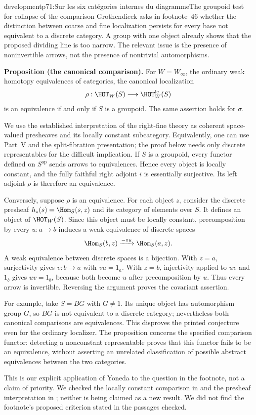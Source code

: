 \begin{dcomment}{development}{p71:Sur les six catégories internes du diagramme}{The groupoid test for collapse of the comparison}
Grothendieck asks in footnote~46 whether the distinction between coarse and fine localization persists for every base not equivalent to a discrete category. A group with one object already shows that the proposed dividing line is too narrow. The relevant issue is the presence of noninvertible arrows, not the presence of nontrivial automorphisms.

\textbf{Proposition (the canonical comparison).}\ours
For $W=W_\infty$, the ordinary weak homotopy equivalences of categories, the canonical localization
\[
 \rho:\HOT_W(S)\longrightarrow\HOT_W^{\mathrm{lc}}(S)
\]
is an equivalence if and only if $S$ is a groupoid. The same assertion holds for $\sigma$.

We use the established interpretation of the right-fine theory as coherent space-valued presheaves and its locally constant subcategory. Equivalently, one can use Part~V and the split-fibration presentation; the proof below needs only discrete representables for the difficult implication. If $S$ is a groupoid, every functor defined on $S^{\mathrm{op}}$ sends arrows to equivalences. Hence every object is locally constant, and the fully faithful right adjoint $i$ is essentially surjective. Its left adjoint $\rho$ is therefore an equivalence.

Conversely, suppose $\rho$ is an equivalence. For each object $z$, consider the discrete presheaf $h_z(s)=\Hom_S(s,z)$ and its category of elements over $S$. It defines an object of $\HOT_W(S)$. Since this object must be locally constant, precomposition by every $u:a\to b$ induces a weak equivalence of discrete spaces
\[
 \Hom_S(b,z)\xrightarrow{-\circ u}\Hom_S(a,z).
\]
A weak equivalence between discrete spaces is a bijection. With $z=a$, surjectivity gives $v:b\to a$ with $vu=1_a$. With $z=b$, injectivity applied to $uv$ and $1_b$ gives $uv=1_b$, because both become $u$ after precomposition by $u$. Thus every arrow is invertible. Reversing the argument proves the covariant assertion.

For example, take $S=BG$ with $G\ne1$. Its unique object has automorphism group $G$, so $BG$ is not equivalent to a discrete category; nevertheless both canonical comparisons are equivalences. This disproves the printed conjecture even for the ordinary localizer. The proposition concerns the specified comparison functor: detecting a nonconstant representable proves that this functor fails to be an equivalence, without asserting an unrelated classification of possible abstract equivalences between the two categories.

This is our explicit application of Yoneda to the question in the footnote, not a claim of priority. We checked the locally constant comparison in \citet[\S\S1--2]{Cisinski2009LocallyConstant} and the presheaf interpretation in \citet[Theorem~2.2.1.2]{Lurie2009HTT}; neither is being claimed as a new result. We did not find the footnote's proposed criterion stated in the passages checked.
\end{dcomment}

